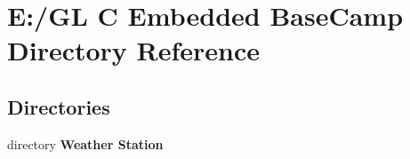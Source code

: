 \section{E\+:/\+GL C Embedded Base\+Camp Directory Reference}
\label{dir_1a915ca30c09b0eb92141a8fe3c62a73}
\subsection*{Directories}
\begin{DoxyCompactItemize}
\item 
directory \textbf{ Weather Station}
\end{DoxyCompactItemize}

